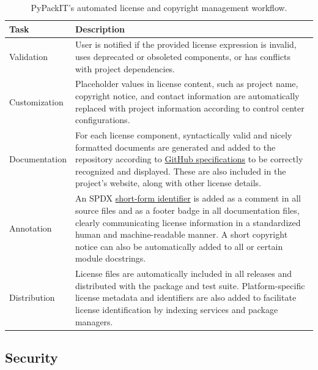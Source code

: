 \documentclass{article}
\begin{document}
\begin{table}[h!]
    \centering
    \caption{PyPackIT's automated license and copyright management workflow.}
    \label{tab:licensing}
    \begin{tabularx}{\textwidth}{p{2.4cm} X}
        \toprule
        \rowcolor{white} \textbf{Task} & \textbf{Description} \\
        \midrule

        Validation & User is notified if the provided license expression is invalid, uses deprecated or obsoleted components, or has conflicts with project dependencies. \\
        
        Customization & Placeholder values in license content, such as project name, copyright notice, and contact information are automatically replaced with project information according to control center configurations. \\
  
        Documentation & For each license component, syntactically valid and nicely formatted documents are generated and added to the repository according to \href{https://github.blog/changelog/2022-05-26-easily-discover-and-navigate-to-multiple-licenses-in-repositories/}{GitHub specifications} to be correctly recognized and displayed. These are also included in the project's website, along with other license details. \\
        
        Annotation & An SPDX \href{https://spdx.dev/learn/handling-license-info/}{short-form identifier} is added as a comment in all source files and as a footer badge in all documentation files, clearly communicating license information in a standardized human and machine-readable manner. A short copyright notice can also be automatically added to all or certain module docstrings. \\
       
        Distribution & License files are automatically included in all releases and distributed with the package and test suite. Platform-specific license metadata and identifiers are also added to facilitate license identification by indexing services and package managers.\\

        \bottomrule
    \end{tabularx}
\end{table}

\subsection{Security}
\end{document}
